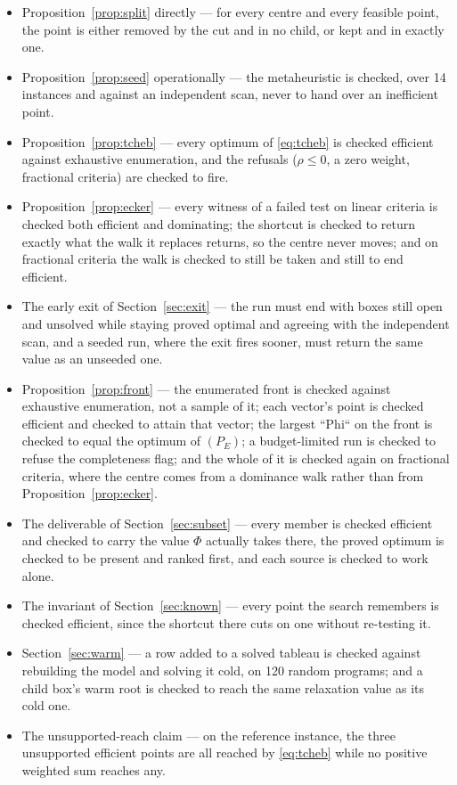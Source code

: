 \documentclass[11pt,a4paper]{article}
\begin{document}
\begin{itemize}
\itemsep2pt
\item Proposition~\ref{prop:split} directly --- for every centre and every
      feasible point, the point is either removed by the cut and in no child,
      or kept and in exactly one.
\item Proposition~\ref{prop:seed} operationally --- the metaheuristic is
      checked, over 14 instances and against an independent scan, never to hand
      over an inefficient point.
\item Proposition~\ref{prop:tcheb} --- every optimum of \eqref{eq:tcheb} is
      checked efficient against exhaustive enumeration, and the refusals
      ($\rho \leqslant 0$, a zero weight, fractional criteria) are checked to
      fire.
\item Proposition~\ref{prop:ecker} --- every witness of a failed test on
      linear criteria is checked both efficient and dominating; the shortcut is
      checked to return exactly what the walk it replaces returns, so the
      centre never moves; and on fractional criteria the walk is checked to
      still be taken and still to end efficient.
\item The early exit of Section~\ref{sec:exit} --- the run must end with boxes
      still open and unsolved while staying proved optimal and agreeing with
      the independent scan, and a seeded run, where the exit fires sooner, must
      return the same value as an unseeded one.
\item Proposition~\ref{prop:front} --- the enumerated front is checked
      against exhaustive enumeration, not a sample of it; each vector's point
      is checked efficient and checked to attain that vector; the largest
      ``Phi`` on the front is checked to equal the optimum of $(P_E)$; a
      budget-limited run is checked to refuse the completeness flag; and the
      whole of it is checked again on fractional criteria, where the centre
      comes from a dominance walk rather than from
      Proposition~\ref{prop:ecker}.
\item The deliverable of Section~\ref{sec:subset} --- every member is checked
      efficient and checked to carry the value $\Phi$ actually takes there, the
      proved optimum is checked to be present and ranked first, and each source
      is checked to work alone.
\item The invariant of Section~\ref{sec:known} --- every point the search
      remembers is checked efficient, since the shortcut there cuts on one
      without re-testing it.
\item Section~\ref{sec:warm} --- a row added to a solved tableau is checked
      against rebuilding the model and solving it cold, on 120 random programs;
      and a child box's warm root is checked to reach the same relaxation value
      as its cold one.
\item The unsupported-reach claim --- on the reference instance, the three
      unsupported efficient points are all reached by \eqref{eq:tcheb} while no
      positive weighted sum reaches any.
\end{itemize}
\end{document}
